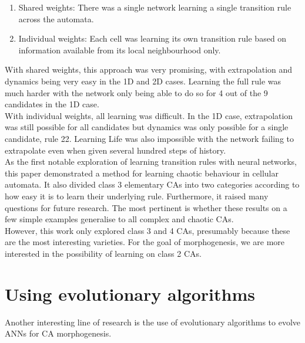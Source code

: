 \begin{enumerate}
  \item Shared weights: There was a single network learning a single transition rule across the automata.
  \item Individual weights: Each cell was learning its own transition rule based on information available from its local neighbourhood only.
\end{enumerate}

With shared weights, this approach was very promising, with extrapolation and dynamics being very easy in the 1D and 2D cases.
Learning the full rule was much harder with the network only being able to do so for 4 out of the 9 candidates in the 1D case. \\ 

With individual weights, all learning was difficult. 
In the 1D case, extrapolation was still possible for all candidates but dynamics was only possible for a single candidate, rule 22. 
Learning Life was also impossible with the network failing to extrapolate even when given several hundred steps of history.\\ 

As the first notable exploration of learning transition rules with neural networks, this paper demonstrated a method for learning chaotic behaviour in cellular automata.
It also divided class 3 elementary CAs into two categories according to how easy it is to learn their underlying rule.
Furthermore, it raised many questions for future research.
The most pertinent is whether these results on a few simple examples generalise to all complex and chaotic CAs.\\

However, this work only explored class 3 and 4 CAs, presumably because these are the most interesting varieties.
For the goal of morphogenesis, we are more interested in the possibility of learning on class 2 CAs.

\section{Using evolutionary algorithms}
Another interesting line of research is the use of evolutionary algorithms to evolve ANNs for CA morphogenesis.\\

